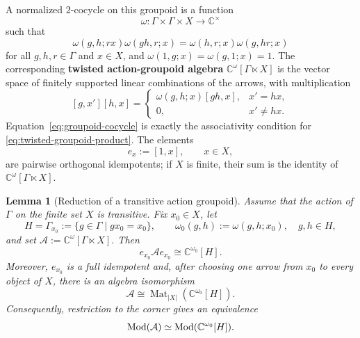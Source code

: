 \documentclass{amsart}
\newtheorem{lemma}[theorem]{Lemma}
\theoremstyle{definition}
\newcommand{\Ctimes}{\mathbb{C}^{\times}}
\numberwithin{equation}{section}
\begin{document}
A normalized $2$-cocycle on this groupoid is a function
\[
 \omega:\Gamma\times\Gamma\times X\longrightarrow\Ctimes
\]
such that
\begin{equation}\label{eq:groupoid-cocycle}
 \omega(g,h;rx)\omega(gh,r;x)
 =\omega(h,r;x)\omega(g,hr;x)
\end{equation}
for all $g,h,r\in\Gamma$ and $x\in X$, and
$\omega(1,g;x)=\omega(g,1;x)=1$.  The corresponding {\bf twisted action-groupoid
algebra} $\mathbb C^{\omega}[\Gamma\ltimes X]$ is the vector space of finitely
supported linear combinations of the arrows, with multiplication
\begin{equation}\label{eq:twisted-groupoid-product}
 [g,x'][h,x]
 =
 \begin{cases}
  \omega(g,h;x)[gh,x],&x'=hx,\\
  0,&x'\neq hx.
 \end{cases}
\end{equation}
Equation~\eqref{eq:groupoid-cocycle} is exactly the associativity condition for
\eqref{eq:twisted-groupoid-product}.  The elements
\[
 e_x:=[1,x],\qquad x\in X,
\]
are pairwise orthogonal idempotents; if $X$ is finite, their sum is the identity
of $\mathbb C^{\omega}[\Gamma\ltimes X]$.

\begin{lemma}[Reduction of a transitive action groupoid]
\label{lem:transitive-groupoid-reduction}
Assume that the action of $\Gamma$ on the finite set $X$ is transitive.  Fix
$x_0\in X$, let
\[
 H=\Gamma_{x_0}:=\{g\in\Gamma\mid gx_0=x_0\},
 \qquad
 \omega_0(g,h):=\omega(g,h;x_0),\quad g,h\in H,
\]
and set $\mathcal A:=\mathbb C^{\omega}[\Gamma\ltimes X]$.  Then
\[
 e_{x_0}\mathcal A e_{x_0}\cong\mathbb C^{\omega_0}[H].
\]
Moreover, $e_{x_0}$ is a full idempotent and, after choosing one arrow from
$x_0$ to every object of $X$, there is an algebra isomorphism
\begin{equation}\label{eq:transitive-groupoid-matrix-reduction}
 \mathcal A
 \cong
 \operatorname{Mat}_{|X|}\!\left(\mathbb C^{\omega_0}[H]\right).
\end{equation}
Consequently, restriction to the corner gives an equivalence
\[
 {\rm Mod}(\mathcal A)
 \simeq
 {\rm Mod}(\mathbb C^{\omega_0}[H]).
\]
\end{lemma}
\end{document}
